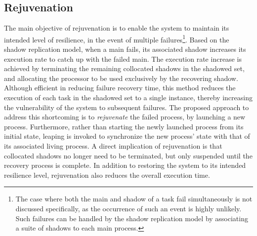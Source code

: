 \subsection{Rejuvenation}

The main objective of rejuvenation is to enable the system to maintain its intended level of resilience, in the event of multiple failures\footnote{The case where both the main and shadow of a task fail simultaneously is not discussed specifically, as the occurrence of such an event is highly unlikely. Such failures can be handled by the shadow replication model by associating a suite of shadows to each main process.}. Based on the shadow replication model, when a main fails, its associated shadow increases its execution rate to catch up with the failed main. The execution rate increase is achieved by terminating the remaining collocated shadows in the shadowed set, and allocating the processor to be used exclusively by the recovering shadow. Although efficient in reducing failure recovery time, this method reduces the execution of each task in the shadowed set to a single instance, thereby increasing the vulnerability of the system to subsequent failures. 
The proposed approach to address this shortcoming is to \textit{rejuvenate} the failed process, by launching a new process. Furthermore, rather than starting the newly launched process from its initial state, leaping is invoked to synchronize the new process' state with that of its associated living process. A direct implication of rejuvenation is that collocated shadows no longer need to be terminated, but only suspended until the recovery process is complete.  In addition to restoring the system to its intended resilience level, rejuvenation also reduces the overall execution time. 



